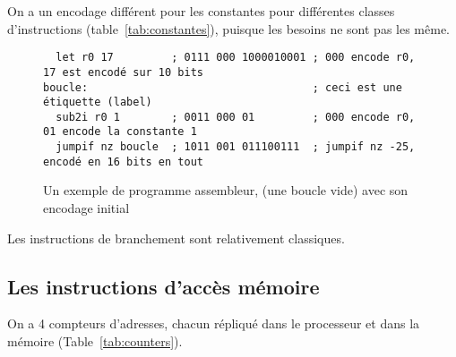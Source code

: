 \documentclass[architecture]{compas2018}
\begin{document}
On a un encodage différent pour les constantes pour différentes classes d'instructions (table~\ref{tab:constantes}), puisque les besoins ne sont pas les même.

\begin{figure}
  \centering
\begin{verbatim}
  let r0 17         ; 0111 000 1000010001 ; 000 encode r0,  17 est encodé sur 10 bits
boucle:	                                  ; ceci est une étiquette (label)
  sub2i r0 1        ; 0011 000 01         ; 000 encode r0, 01 encode la constante 1
  jumpif nz boucle  ; 1011 001 011100111  ; jumpif nz -25, encodé en 16 bits en tout 
\end{verbatim}
  \caption{Un exemple de programme assembleur, (une boucle vide) avec son encodage initial}
  \label{fig:exempleasm}
\end{figure}


Les instructions de branchement sont relativement classiques.

\iffalse
\subsection{Les instructions de branchement }
\label{sec:jumpcallret}

Soit $a$ l'adresse du premier bit suivant l'instruction \texttt{jump} ou \texttt{call} (i.e. la valeur du PC lorsqu'il a fini de lire l'instruction et ses opérandes).
Soit $d$ la valeur de déplacement (encodée dans une constante de type \textit{addr}, et signée).

L'instruction \texttt{jump} réalise $\mathtt{pc}\leftarrow a + c$.
L'instruction \texttt{jumpif} aussi, mais seulement si la condition est vraie.

La condition  est encodée sur trois bits  selon la table~\ref{tab:conditions} (ARM utilise 4 bits).

L'instruction \texttt{call} copie $\texttt{a}$ dans $r_{7}$, puis réalise $\mathtt{pc} \leftarrow \texttt{d}$
(\emph{addr} est toujours signé).

L'instruction \texttt{return} copie \texttt{r7} dans \texttt{pc}.

\fi

\subsection{Les instructions d'accès mémoire}
\label{sec:mem}



On a 4 compteurs d'adresses, chacun  répliqué dans le processeur et dans la mémoire (Table~\ref{tab:counters}).
\end{document}
